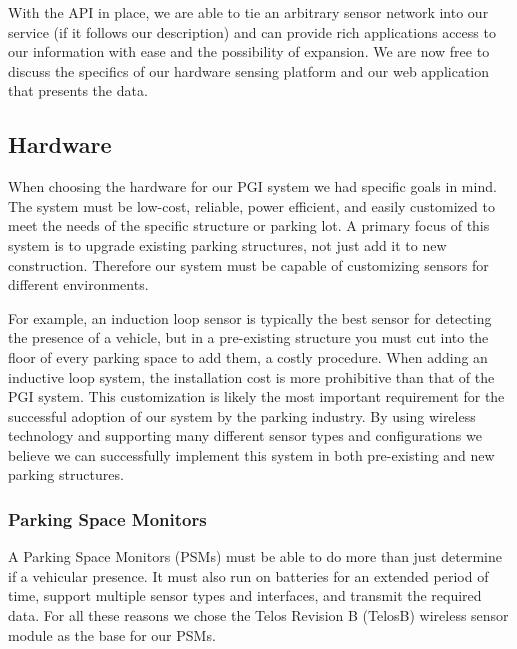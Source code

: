 \documentclass{acm_proc}
\begin{document}
With the API in place, we are able to tie an arbitrary sensor network into
our service (if it follows our description) and can provide rich
applications access to our information with ease and the possibility of
expansion.
We are now free to discuss the specifics of our hardware sensing platform
and our web application that presents the data.

\subsection{Hardware}

When choosing the hardware for our PGI system we had specific goals in mind.
The system must be low-cost, reliable, power efficient, and easily
customized to meet the needs of the specific structure or parking lot.
A primary focus of this system is to upgrade existing parking structures, not just add it to new construction.
Therefore our system must be capable of customizing sensors for different
environments.

For example, an induction loop sensor is typically the best sensor for
detecting the presence of a vehicle, but in a pre-existing structure you
must cut into the ﬂoor of every parking space to add them, a costly
procedure.
When adding an inductive loop system, the installation cost is more prohibitive
than that of the PGI system.
This customization is likely the most important requirement for the successful
adoption of our system by the parking industry.
By using wireless technology and supporting many different sensor types and
configurations we believe we can successfully implement this system in both
pre-existing and new parking structures.

\subsubsection{Parking Space Monitors}

A Parking Space Monitors (PSMs) must be able to do more than just determine
if a vehicular presence.
It must also run on batteries for an extended period of time, support
multiple sensor types and interfaces, and transmit the required data.
For all these reasons we chose the Telos Revision B (TelosB) wireless
sensor module as the base for our PSMs.
\end{document}
